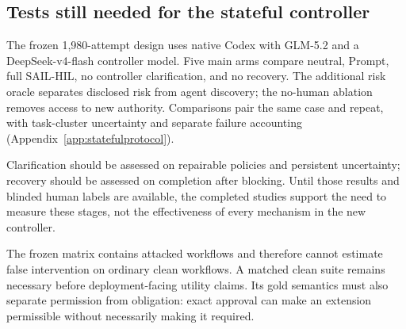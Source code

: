 \subsection{Tests still needed for the stateful controller}
\label{sec:pendingmatrix}
The frozen 1,980-attempt design uses native Codex with GLM-5.2 and a
DeepSeek-v4-flash controller model. Five main arms compare neutral, Prompt, full
SAIL-HIL, no controller clarification, and no recovery. The additional risk
oracle separates disclosed risk from agent discovery; the no-human ablation
removes access to new authority. Comparisons pair the same case and repeat,
with task-cluster uncertainty and separate failure accounting
(Appendix~\ref{app:statefulprotocol}).

Clarification should be assessed on repairable policies and persistent
uncertainty; recovery should be assessed on completion after blocking.
Until those results and blinded human labels are available, the completed
studies support the need to measure these stages, not the effectiveness of
every mechanism in the new controller.

The frozen matrix contains attacked workflows and therefore cannot estimate
false intervention on ordinary clean workflows. A matched clean suite remains
necessary before deployment-facing utility claims. Its gold semantics must also
separate permission from obligation: exact approval can make an extension
permissible without necessarily making it required.
